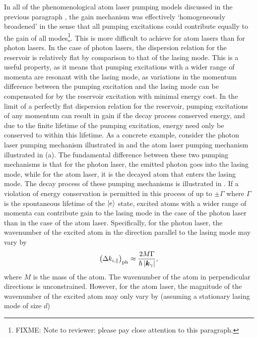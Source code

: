 In all of the phenomenological atom laser pumping models discussed in the previous paragraph \citep{Haine:2002kp,Kneer:1998fk,Robins:2001pd}, the gain mechanism was effectively `homogeneously broadened' in the sense that all pumping excitations could contribute equally to the gain of all modes\footnote{FIXME: Note to reviewer: please pay close attention to this paragraph.}.  This is more difficult to achieve for atom lasers than for photon lasers.  In the case of photon lasers, the dispersion relation for the reservoir is relatively flat by comparison to that of the lasing mode.  This is a useful property, as it means that pumping excitations with a wider range of momenta are resonant with the lasing mode, as variations in the momentum difference between the pumping excitation and the lasing mode can be compensated for by the reservoir excitation with minimal energy cost.  In the limit of a perfectly flat dispersion relation for the reservoir, pumping excitations of any momentum can result in gain if the decay process conserved energy, and due to the finite lifetime of the pumping excitation, energy need only be conserved to within this lifetime.  As a concrete example, consider the photon laser pumping mechanism illustrated in  and the atom laser pumping mechanism illustrated in (a).  The fundamental difference between these two pumping mechanisms is that for the photon laser, the emitted photon goes into the lasing mode, while for the atom laser, it is the decayed atom that enters the lasing mode.  The decay process of these pumping mechanisms is illustrated in .  If a violation of energy conservation is permitted in this process of up to $\pm \Gamma$ where $\Gamma$ is the spontaneous lifetime of the ${\left|e\right>}$ state, excited atoms with a wider range of momenta can contribute gain to the lasing mode in the case of the photon laser than in the case of the atom laser.  Specifically, for the photon laser, the wavenumber of the excited atom in the direction parallel to the lasing mode may vary by
\begin{align*}
    \left(\Delta k_{i,\parallel}\right)_\text{ph} \approx \frac{2 M \Gamma}{\hbar \left|\bm{k}_\gamma\right|},
\end{align*}
where $M$ is the mass of the atom.  The wavenumber of the atom in perpendicular directions is unconstrained.  However, for the atom laser, the magnitude of the wavenumber of the excited atom may only vary by (assuming a stationary lasing mode of size $d$)
